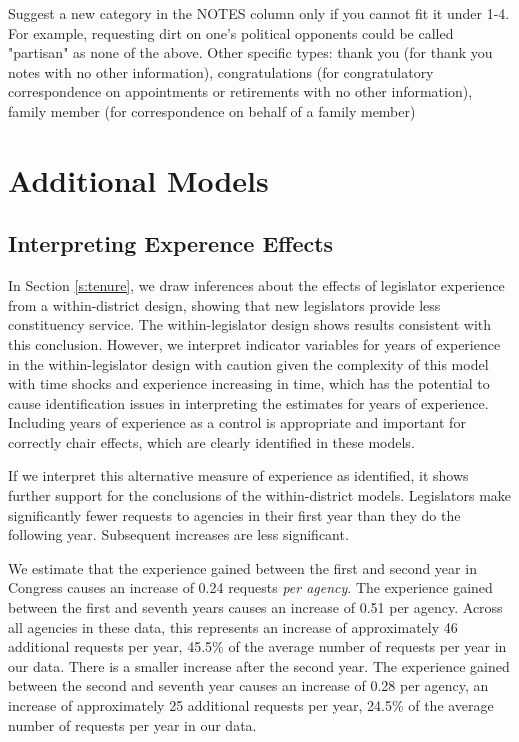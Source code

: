 \hfill\begin{minipage}{\dimexpr\textwidth-2cm}
	Suggest a new category in the NOTES column only if you cannot fit it under 1-4. For example, requesting dirt on one's political opponents could be called "partisan" as none of the above. Other specific types: thank you (for thank you notes with no other information), congratulations (for congratulatory correspondence on appointments or retirements with no other information), family member (for correspondence on behalf of a family member) \\
\end{minipage}

\clearpage


\section{Additional Models} \label{s:appendix_models}

\subsection{Interpreting Experence Effects }

In Section \ref{s:tenure}, we draw inferences about the effects of legislator experience from a within-district design, showing that new legislators provide less constituency service. The within-legislator design shows results consistent with this conclusion. However, we interpret indicator variables for years of experience in the within-legislator design with caution given the complexity of this model with time shocks and experience increasing in time, which has the potential to cause identification issues in interpreting the estimates for years of experience. Including years of experience as a control is appropriate and important for correctly chair effects, which are clearly identified in these models.  

If we interpret this alternative measure of experience as identified, it shows further support for the conclusions of the within-district models. Legislators make significantly fewer requests to agencies in their first year than they do the following year. Subsequent increases are less significant.  

We estimate that the experience gained between the first and second year in Congress causes an increase of 0.24 requests \textit{per agency}. The experience gained between the first and seventh years causes an increase of 0.51 per agency. Across all  agencies in these data, this represents an increase of approximately 46 additional requests per year, 45.5\% of the average number of requests per year in our data. There is a smaller increase after the second year. The experience gained between the second and seventh year causes an increase of 0.28 per agency, an increase of approximately 25 additional requests per year, 24.5\% of the average number of requests per year in our data.

